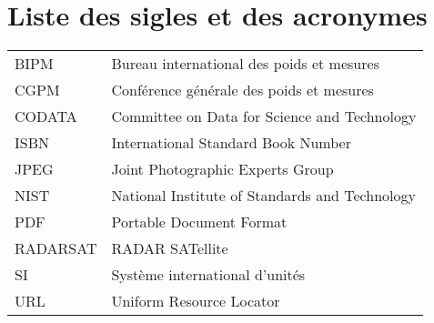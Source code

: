 
%
%

\chapter{Liste des sigles et des acronymes}


\begin{flushleft}
   \begin{tabular}{@{}ll}
      BIPM        & Bureau international des poids et mesures        \\
      CGPM        & Conférence générale des poids et mesures         \\
      CODATA      & Committee on Data for Science and Technology     \\
      ISBN        & International Standard Book Number               \\
      JPEG        & Joint Photographic Experts Group                 \\
      NIST        & National Institute of Standards and Technology   \\
      PDF         & Portable Document Format                         \\
      RADARSAT    & RADAR SATellite                                  \\
      SI          & Système international d'unités                   \\
      URL         & Uniform Resource Locator                         \\
   \end{tabular}
\end{flushleft}







